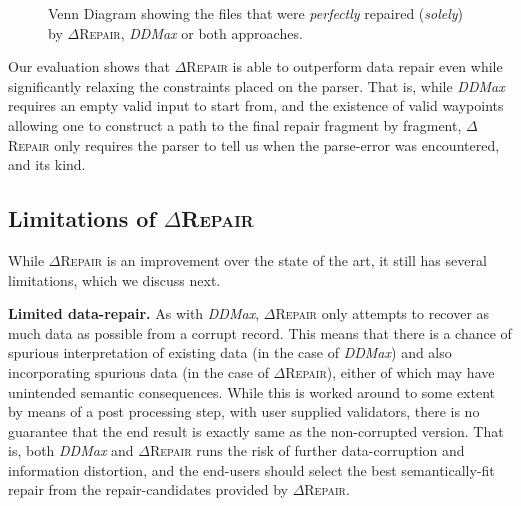 \documentclass[acmsmall,screen,review,anonymous]{acmart}
\newcounter{todocounter}
\newcommand{\todo}[1]{\marginpar{$|$}\textcolor{red}{\stepcounter{todocounter}\footnote[\thetodocounter]{\textcolor{red}{\textbf{TODO }}\textit{#1}}}}
\renewcommand{\todo}[1]{}
\newcommand{\dtask}{data repair\xspace}
\newcommand{\approach}{\textsc{$\Delta$Repair}\xspace}
\newcommand{\ddmax}{\textit{DDMax}\xspace}
\newcommand{\drepair}{\approach}
\begin{document}
\begin{figure}[!tbp]\centering
\caption{\centering Venn Diagram showing the 
files that were \textit{perfectly} repaired (\textit{solely}) by \approach,  \ddmax or both approaches. 
}
\centering
\begin{minipage}[b]{0.45\textwidth}
    \centering
\end{minipage}
\vspace{-0.4cm}
\label{fig:perfectlyrepairedvenndiagram}
\end{figure}

Our evaluation shows that \drepair is able to outperform 
\dtask even while significantly relaxing the constraints placed on the parser.
That is, while \ddmax requires an empty valid input to start from, and the
existence of valid waypoints allowing one to construct a path to the final
repair fragment by fragment, \drepair only requires the parser to tell us when
the parse-error was encountered, and its kind.

\subsection{Limitations of \drepair}
While \drepair is an improvement over the state of the art, it still has
several limitations, which we discuss next.


\noindent\textbf{Limited data-repair.} As with \ddmax, \drepair only attempts
to recover as much data as possible from a corrupt record. This means that there
is a chance of spurious interpretation of existing data (in the case of \ddmax)
and also incorporating spurious data (in the case of \drepair), either of which
may have unintended semantic consequences. While this is
worked around to some extent by means of a post processing step, with user
supplied validators, there is no guarantee that the end result is exactly same
as the non-corrupted version. That is, both \ddmax and \drepair runs the risk
of further data-corruption and information distortion, and the end-users should
select the best semantically-fit repair from the repair-candidates provided by
\drepair.
\end{document}
